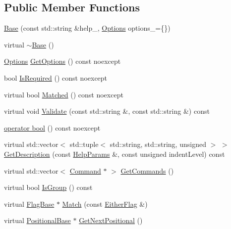 \subsection*{Public Member Functions}
\begin{DoxyCompactItemize}
\item 
\hyperlink{classargs_1_1_base_a70f9c2513df7df1dcf6cab427bb77dce}{Base} (const std\+::string \&help\+\_\+, \hyperlink{namespaceargs_aa530c0f95194aa275f49a5f299ac9e77}{Options} options\+\_\+=\{\})
\item 
virtual \hyperlink{classargs_1_1_base_a30b61d4bac37578b989df06713781de9}{$\sim$\+Base} ()
\item 
\hyperlink{namespaceargs_aa530c0f95194aa275f49a5f299ac9e77}{Options} \hyperlink{classargs_1_1_base_ad44e55adfb22e0ddb0ac5e4248614143}{Get\+Options} () const noexcept
\item 
bool \hyperlink{classargs_1_1_base_a3d705fcb8aa72e6f16a18e47dee12a62}{Is\+Required} () const noexcept
\item 
virtual bool \hyperlink{classargs_1_1_base_ae7ae4ca8ad953be1a353991c1df6ec4d}{Matched} () const noexcept
\item 
virtual void \hyperlink{classargs_1_1_base_a62ea917978306062785cbfaa4dd51d2f}{Validate} (const std\+::string \&, const std\+::string \&) const
\item 
\hyperlink{classargs_1_1_base_ad356e2bd5711e86d005bdc7c483a347e}{operator bool} () const noexcept
\item 
virtual std\+::vector$<$ std\+::tuple$<$ std\+::string, std\+::string, unsigned $>$ $>$ \hyperlink{classargs_1_1_base_afbdf4f1ca1f61182ef0461e02e9e9ed3}{Get\+Description} (const \hyperlink{structargs_1_1_help_params}{Help\+Params} \&, const unsigned indent\+Level) const
\item 
virtual std\+::vector$<$ \hyperlink{classargs_1_1_command}{Command} $\ast$ $>$ \hyperlink{classargs_1_1_base_a8b41df1247be5545f95279608d835bf2}{Get\+Commands} ()
\item 
virtual bool \hyperlink{classargs_1_1_base_a72e11d38c82b8dca87b830853676b68c}{Is\+Group} () const
\item 
virtual \hyperlink{classargs_1_1_flag_base}{Flag\+Base} $\ast$ \hyperlink{classargs_1_1_base_a6d5a7be35d62f59fee5a52c06af3003e}{Match} (const \hyperlink{structargs_1_1_either_flag}{Either\+Flag} \&)
\item 
virtual \hyperlink{classargs_1_1_positional_base}{Positional\+Base} $\ast$ \hyperlink{classargs_1_1_base_a3e5ad8516fd2037496cd39bcb3b10f9d}{Get\+Next\+Positional} ()

\end{DoxyCompactItemize}
